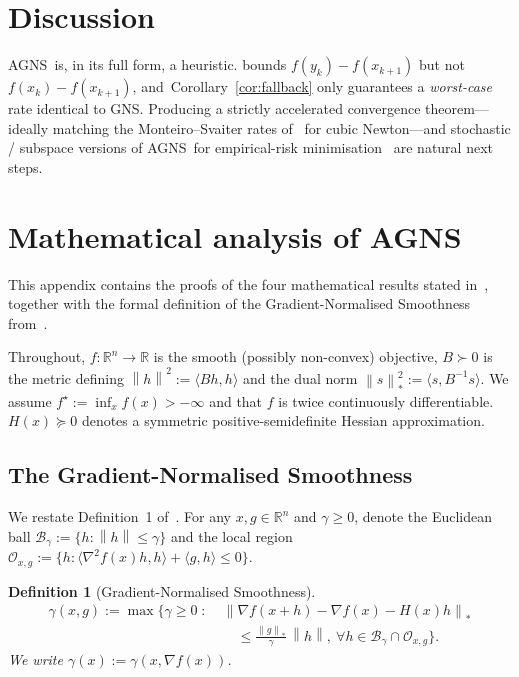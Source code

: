 \documentclass[conference]{IEEEtran}
\newtheorem{definition}[theorem]{Definition}
\theoremstyle{remark}
\newcommand{\R}{\mathbb{R}}
\newcommand{\dnorm}[1]{\left\lVert#1\right\rVert_*}
\newcommand{\norm}[1]{\left\lVert#1\right\rVert}
\newcommand{\AGNS}{\textsc{AGNS}}
\newcommand{\GNS}{\textsc{GNS}}
\begin{document}
\section{Discussion}
\label{sec:discussion}

\AGNS\ is, in its full form, a heuristic.
 bounds $f(y_k) - f(x_{k+1})$ but not
$f(x_k) - f(x_{k+1})$, and~Corollary~\ref{cor:fallback} only guarantees a
\emph{worst-case} rate identical to \GNS. Producing a strictly
accelerated convergence theorem---ideally matching the
Monteiro--Svaiter rates of~\cite{carmon2022optimal} for cubic
Newton---and stochastic / subspace versions of \AGNS\ for
empirical-risk minimisation~\cite{martens2020insights} are natural
next steps.




\appendices

\section{Mathematical analysis of \AGNS}
\label{app:math}

This appendix contains the proofs of the four mathematical results
stated in~, together with the formal definition
of the Gradient-Normalised Smoothness from~\cite{semenov2025gradient}.

Throughout, $f \colon \R^n \to \R$ is the smooth (possibly non-convex)
objective, $B \succ 0$ is the metric defining $\norm{h}^2 :=
\langle Bh, h\rangle$ and the dual norm $\dnorm{s}^2 := \langle s, B^{-1} s\rangle$.
We assume $f^\star := \inf_x f(x) > -\infty$ and that $f$ is twice
continuously differentiable. $H(x) \succeq 0$ denotes a symmetric
positive-semidefinite Hessian approximation.

\subsection{The Gradient-Normalised Smoothness}
\label{app:gns-defn}

We restate Definition~1 of~\cite{semenov2025gradient}. For any $x, g
\in \R^n$ and $\gamma \ge 0$, denote the Euclidean ball
$\mathcal{B}_\gamma := \{ h : \norm{h} \le \gamma \}$ and the local
region $\mathcal{O}_{x,g} := \{h : \langle\nabla^2 f(x) h, h\rangle +
\langle g, h\rangle \le 0\}$.

\begin{definition}[Gradient-Normalised Smoothness]
\label{def:gns}
\begin{align*}
\gamma(x, g) := \max \Big\{ \gamma \ge 0 \;\colon\;
  & \dnorm{\nabla f(x{+}h) - \nabla f(x) - H(x) h} \\
  & \quad \le \tfrac{\dnorm{g}}{\gamma}\,\norm{h},\
  \forall h \in \mathcal{B}_\gamma \cap \mathcal{O}_{x,g} \Big\}.
\end{align*}
We write $\gamma(x) := \gamma(x, \nabla f(x))$.
\end{definition}
\end{document}
